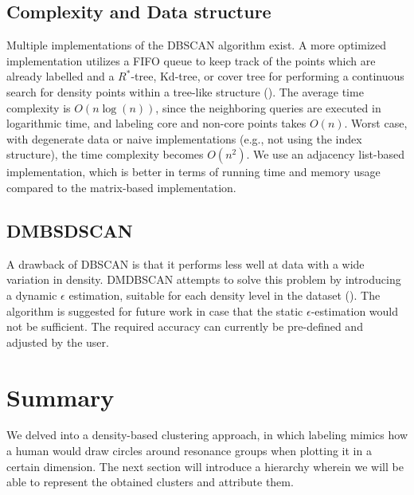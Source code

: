 \subsection{Complexity and Data structure}
Multiple implementations of the DBSCAN algorithm exist. A more optimized implementation utilizes a FIFO queue to keep track of the points which are already labelled and a $R^*$-tree, Kd-tree, or cover tree for performing a continuous search for density points within a tree-like structure (\cite{schubert_dbscan_2017}). The average time complexity is $O(n\log(n))$, since the neighboring queries are executed in logarithmic time, and labeling core and non-core points takes $O(n)$. Worst case, with degenerate data or naive implementations (e.g., not using the index structure), the time complexity becomes $O(n^2)$. We use an adjacency list-based implementation, which is better in terms of running time and memory usage compared to the matrix-based implementation.


\subsection{DMBSDSCAN}
A drawback of  DBSCAN is that it performs less well at data with a wide variation in density. DMDBSCAN attempts to solve this problem by introducing a dynamic $\epsilon$ estimation, suitable for each density level in the dataset (\cite{elbatta_dynamic_2013}). The algorithm is suggested for future work in case that the static $\epsilon$-estimation would not be sufficient. The required accuracy can currently be pre-defined and adjusted by the user.


\section{Summary}
We delved into a density-based clustering approach, in which labeling mimics how a human would draw circles around resonance groups when plotting it in a certain dimension. The next section will introduce a hierarchy wherein we will be able to represent the obtained clusters and attribute them.
